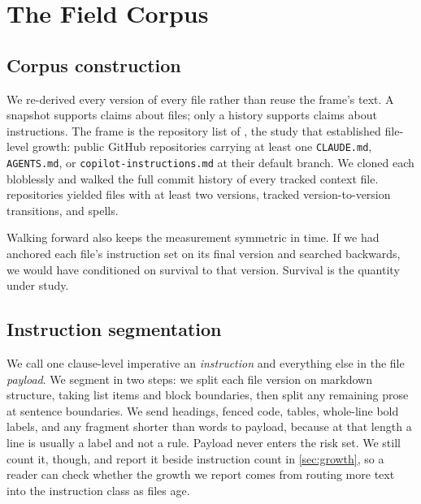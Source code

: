 
\section{The Field Corpus}
\label{sec:appendix:corpus}

\subsection{Corpus construction}
\label{sec:appendix:construction}

We re-derived every version of every file rather than reuse the frame's text. A snapshot supports
claims about files; only a history supports claims about instructions. The frame is the repository
list of \citet{chatlatanagulchai2025agentreadmes}, the study that established file-level growth:
public GitHub repositories carrying at least one \texttt{CLAUDE.md}, \texttt{AGENTS.md}, or
\texttt{copilot-instructions.md} at their default branch. We cloned each bloblessly and walked the
full commit history of every tracked context file. \FieldRepos{} repositories yielded
\FieldMultiVersionFiles{} files with at least two versions, \FieldMatches{} tracked
version-to-version transitions, and \FieldSpells{} spells.

Walking forward also keeps the measurement symmetric in time. If we had anchored each file's
instruction set on its final version and searched backwards, we would have conditioned on survival
to that version. Survival is the quantity under study.

\subsection{Instruction segmentation}
\label{sec:appendix:matching}



We call one clause-level imperative an \emph{instruction} and everything else in the file
\emph{payload}. We segment in two steps: we split each file version on markdown structure, taking
list items and block boundaries, then split any remaining prose at sentence boundaries. We send
headings, fenced code, tables, whole-line bold labels, and any fragment shorter than
\SegMinWords{} words to payload, because at that length a line is usually a label and not a rule.
Payload never enters the risk set. We still count it, though, and report it beside instruction
count in \autoref{sec:growth}, so a reader can check whether the growth we report comes from
routing more text into the instruction class as files age.

